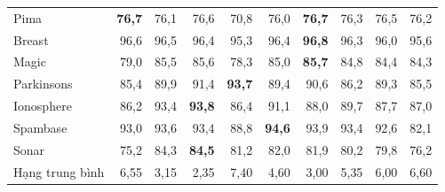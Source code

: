 \begin{table}[t]
{\begin{tabular}{@{}l r r r r r r r r r@{}}
Pima & \textbf{76{,}7} & 76{,}1 & 76{,}6 & 70{,}8 & 76{,}0 & \textbf{76{,}7} & 76{,}3 & 76{,}5 & 76{,}2\\
Breast & 96{,}6 & 96{,}5 & 96{,}4 & 95{,}3 & 96{,}4 & \textbf{96{,}8} & 96{,}3 & 96{,}0 & 95{,}6\\
Magic & 79{,}0 & 85{,}5 & 85{,}6 & 78{,}3 & 85{,}0 & \textbf{85{,}7} & 84{,}8 & 84{,}4 & 84{,}3\\
Parkinsons & 85{,}4 & 89{,}9 & 91{,}4 & \textbf{93{,}7} & 89{,}4 & 90{,}6 & 86{,}2 & 89{,}3 & 85{,}5\\
Ionosphere & 86{,}2 & 93{,}4 & \textbf{93{,}8} & 86{,}4 & 91{,}1 & 88{,}0 & 89{,}7 & 87{,}7 & 87{,}0\\
Spambase & 93{,}0 & 93{,}6 & 93{,}4 & 88{,}8 & \textbf{94{,}6} & 93{,}9 & 93{,}4 & 92{,}6 & 82{,}1\\
Sonar & 75{,}2 & 84{,}3 & \textbf{84{,}5} & 81{,}2 & 82{,}0 & 81{,}9 & 80{,}2 & 79{,}8 & 76{,}2\\
\midrule
Hạng trung bình & 6{,}55 & 3{,}15 & 2{,}35 & 7{,}40 & 4{,}60 & 3{,}00 & 5{,}35 & 6{,}00 & 6{,}60\\
\bottomrule
\end{tabular}}
\end{table}
